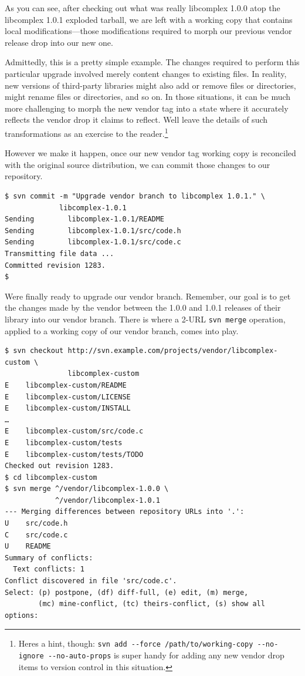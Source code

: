As you can see, after checking out what was really libcomplex 1.0.0 atop
the libcomplex 1.0.1 exploded tarball, we are left with a working copy
that contains local modifications---those modifications required to
morph our previous vendor release drop into our new one.

Admittedly, this is a pretty simple example. The changes required to
perform this particular upgrade involved merely content changes to
existing files. In reality, new versions of third-party libraries might
also add or remove files or directories, might rename files or
directories, and so on. In those situations, it can be much more
challenging to morph the new vendor tag into a state where it accurately
reflects the vendor drop it claims to reflect. We\textquotesingle ll
leave the details of such transformations as an exercise to the
reader.\footnote{Here\textquotesingle s a hint, though:
  \texttt{svn\ add\ -\/-force\ /path/to/working-copy\ -\/-no-ignore\ -\/-no-auto-props}
  is super handy for adding any new vendor drop items to version control
  in this situation.}

However we make it happen, once our new vendor tag working copy is
reconciled with the original source distribution, we can commit those
changes to our repository.

\begin{verbatim}
$ svn commit -m "Upgrade vendor branch to libcomplex 1.0.1." \
             libcomplex-1.0.1
Sending        libcomplex-1.0.1/README
Sending        libcomplex-1.0.1/src/code.h
Sending        libcomplex-1.0.1/src/code.c
Transmitting file data ...
Committed revision 1283.
$
\end{verbatim}

We\textquotesingle re finally ready to upgrade our vendor branch.
Remember, our goal is to get the changes made by the vendor between the
1.0.0 and 1.0.1 releases of their library into our vendor branch. There
is where a 2-URL \texttt{svn\ merge} operation, applied to a working
copy of our vendor branch, comes into play.

\begin{verbatim}
$ svn checkout http://svn.example.com/projects/vendor/libcomplex-custom \
               libcomplex-custom
E    libcomplex-custom/README
E    libcomplex-custom/LICENSE
E    libcomplex-custom/INSTALL
…
E    libcomplex-custom/src/code.c
E    libcomplex-custom/tests
E    libcomplex-custom/tests/TODO
Checked out revision 1283.
$ cd libcomplex-custom
$ svn merge ^/vendor/libcomplex-1.0.0 \
            ^/vendor/libcomplex-1.0.1
--- Merging differences between repository URLs into '.':
U    src/code.h
C    src/code.c
U    README
Summary of conflicts:
  Text conflicts: 1
Conflict discovered in file 'src/code.c'.
Select: (p) postpone, (df) diff-full, (e) edit, (m) merge,
        (mc) mine-conflict, (tc) theirs-conflict, (s) show all options: 
\end{verbatim}

